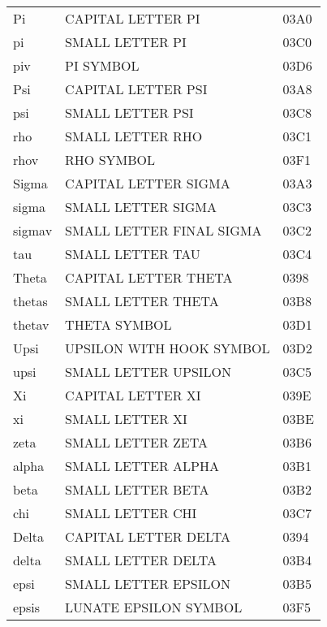 \begin{longtable}{lll}
Pi                 &  CAPITAL LETTER PI             & 03A0\\
pi                 &  SMALL LETTER PI               & 03C0\\
piv                &  PI SYMBOL                     & 03D6\\
Psi                &  CAPITAL LETTER PSI            & 03A8\\
psi                &  SMALL LETTER PSI              & 03C8\\
rho                &  SMALL LETTER RHO              & 03C1\\
rhov               &  RHO SYMBOL                    & 03F1\\
Sigma              &  CAPITAL LETTER SIGMA          & 03A3\\
sigma              &  SMALL LETTER SIGMA            & 03C3\\
sigmav             &  SMALL LETTER FINAL SIGMA      & 03C2\\
tau                &  SMALL LETTER TAU              & 03C4\\
Theta              &  CAPITAL LETTER THETA          & 0398\\
thetas             &  SMALL LETTER THETA            & 03B8\\
thetav             &  THETA SYMBOL                  & 03D1\\
Upsi               &  UPSILON WITH HOOK SYMBOL      & 03D2\\
upsi               &  SMALL LETTER UPSILON          & 03C5\\
Xi                 &  CAPITAL LETTER XI             & 039E\\
xi                 &  SMALL LETTER XI               & 03BE\\
zeta               &  SMALL LETTER ZETA             & 03B6\\
%
%
%
alpha              &  SMALL LETTER ALPHA            & 03B1\\
beta               &  SMALL LETTER BETA             & 03B2\\
chi                &  SMALL LETTER CHI              & 03C7\\
Delta              &  CAPITAL LETTER DELTA          & 0394\\
delta              &  SMALL LETTER DELTA            & 03B4\\
epsi               &  SMALL LETTER EPSILON          & 03B5\\
epsis              &  LUNATE EPSILON SYMBOL         & 03F5\\

\end{longtable}
